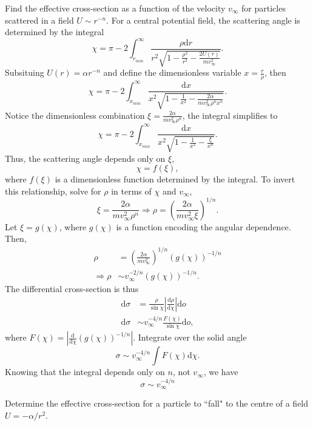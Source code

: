 \begin{problem}
{
Find the effective cross-section as a function of the velocity $v_\infty$ for particles scattered in a field $U \sim r^{-n}$.
}
{
For a central potential field, the scattering angle is determined by the integral
\begin{equation*}
    \chi = \pi - 2\int_{r_{min}}^\infty \frac{\rho \mathrm{d}r}{r^2 \sqrt{1 - \frac{\rho^2}{r^2} - \frac{2U(r)}{mv_\infty^2}}}.
\end{equation*}
Subsituing $U(r) = \alpha r^{-n}$ and define the dimensionless variable $x = \frac{r}{\rho}$, then
\begin{equation*}
    \chi = \pi - 2\int_{x_{min}}^\infty \frac{\mathrm{d}x}{x^2 \sqrt{1 - \frac{1}{x^2} - \frac{2\alpha}{mv_\infty^2\rho^nx^n}}}.
\end{equation*}
Notice the dimensionless combination $\xi = \frac{2\alpha}{mv_\infty^2\rho^n}$, the integral simplifies to
\begin{equation*}
    \chi = \pi - 2\int_{x_{min}}^\infty \frac{\mathrm{d}x}{x^2 \sqrt{1 - \frac{1}{x^2} - \frac{\xi}{x^n}}}.
\end{equation*}
Thus, the scattering angle depends only on $\xi$,
\begin{equation*}
    \chi = f(\xi),
\end{equation*}
where $f(\xi)$ is a dimensionless function determined by the integral. To invert this relationship, solve for $\rho$ in terms of $\chi$ and $v_\infty$,
\begin{equation*}
    \xi = \frac{2\alpha}{mv_\infty^2\rho^n} \Rightarrow \rho = \left( \frac{2\alpha}{mv_\infty^2\xi} \right)^{1/n}.
\end{equation*}
Let $\xi = g(\chi)$, where $g(\chi)$ is a function encoding the angular dependence. Then,
\begin{align*}
    \rho &= \left( \frac{2\alpha}{mv_\infty^2} \right)^{1/n} \left( g(\chi) \right)^{-1/n} \\
    \Rightarrow \rho &\sim v_\infty^{-2/n}\left( g(\chi) \right)^{-1/n}.
\end{align*}
The differential cross-section is thus
\begin{align*}
    \mathrm{d}\sigma &= \frac{\rho}{\sin{\chi}} \left| \frac{\mathrm{d}\rho}{\mathrm{d}\chi} \right| \mathrm{d}o \\
    \mathrm{d}\sigma &\sim v_\infty^{-4/n} \frac{F(\chi)}{\sin{\chi}} \mathrm{d}o,
\end{align*}
where $F(\chi) = \left| \frac{\mathrm{d}}{\mathrm{d}\chi} \left( g(\chi) \right)^{-1/n} \right|$. Integrate over the solid angle
\begin{equation*}
    \sigma \sim v_\infty^{-4/n} \int F(\chi) \mathrm{d}\chi.
\end{equation*}
Knowing that the integral depends only on $n$, not $v_\infty$, we have
}
{
\begin{equation*}
    \sigma \sim v_\infty^{-4/n}
\end{equation*}
}
\end{problem}


\begin{problem}
{
Determine the effective cross-section for a particle to ``fall" to the centre of a field $U=-\alpha/r^2$.
}
{
}
{
}
\end{problem}